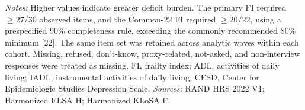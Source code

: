 \begin{landscape}
\vspace{0.20em}
\parbox{\linewidth}{\raggedright\fontsize{8.5}{10.2}\selectfont\textit{Notes:} Higher values indicate greater deficit burden. The primary FI required $\geq 27/30$ observed items, and the Common-22 FI required $\geq 20/22$, using a prespecified 90\% completeness rule, exceeding the commonly recommended 80\% minimum [22]. The same item set was retained across analytic waves within each cohort. Missing, refused, don't-know, proxy-related, not-asked, and non-interview responses were treated as missing. FI, frailty index; ADL, activities of daily living; IADL, instrumental activities of daily living; CESD, Center for Epidemiologic Studies Depression Scale. \textit{Sources:} RAND HRS 2022 V1; Harmonized ELSA H; Harmonized KLoSA F.}
\end{landscape}
